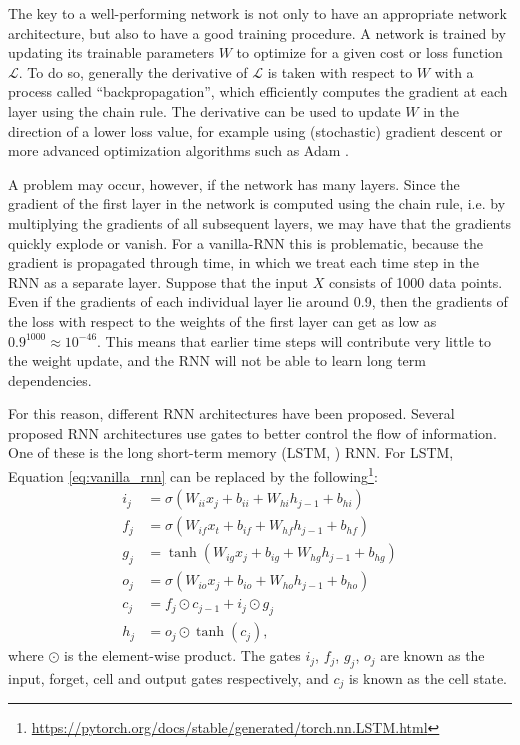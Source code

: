 The key to a well-performing network is not only to have an appropriate network architecture, but also to have a good training procedure. A network is trained by updating its trainable parameters $W$ to optimize for a given cost or loss function $\mathcal{L}$. To do so, generally the derivative of $\mathcal{L}$ is taken with respect to $W$ with a process called ``backpropagation'', which efficiently computes the gradient at each layer using the chain rule. The derivative can be used to update $W$ in the direction of a lower loss value, for example using (stochastic) gradient descent or more advanced optimization algorithms such as Adam \citep{kingma2014adam}.

A problem may occur, however, if the network has many layers. Since the gradient of the first layer in the network is computed using the chain rule, i.e. by multiplying the gradients of all subsequent layers, we may have that the gradients quickly explode or vanish. For a vanilla-RNN this is problematic, because the gradient is propagated through time, in which we treat each time step in the RNN as a separate layer. Suppose that the input $X$ consists of 1000 data points. Even if the gradients of each individual layer lie around 0.9, then the gradients of the loss with respect to the weights of the first layer can get as low as $0.9^{1000}\approx10^{-46}$. This means that earlier time steps will contribute very little to the weight update, and the RNN will not be able to learn long term dependencies.

For this reason, different RNN architectures have been proposed. Several proposed RNN architectures use gates to better control the flow of information. One of these is the long short-term memory (LSTM, \cite{hochreiter1997long}) RNN. For LSTM, Equation \ref{eq:vanilla_rnn} can be replaced by the following\footnote{\url{https://pytorch.org/docs/stable/generated/torch.nn.LSTM.html}}: 
\begin{align}
    i_j &= \sigma(W_{ii}x_j + b_{ii} + W_{hi}h_{j-1} + b_{hi}) \\
    f_j &= \sigma(W_{if}x_t + b_{if} + W_{hf}h_{j-1} + b_{hf}) \\
    g_j &= \tanh(W_{ig}x_j + b_{ig} + W_{hg}h_{j-1} + b_{hg}) \\
    o_j &= \sigma(W_{io}x_j + b_{io} + W_{ho}h_{j-1} + b_{ho}) \\
    c_j &= f_j \odot c_{j-1} + i_j \odot g_j \\
    h_j &= o_j \odot \tanh(c_j),
\end{align}
where  $\odot$ is the element-wise product. The gates $i_j$, $f_j$, $g_j$, $o_j$ are known as the input, forget, cell and output gates respectively, and $c_j$ is known as the cell state. 

